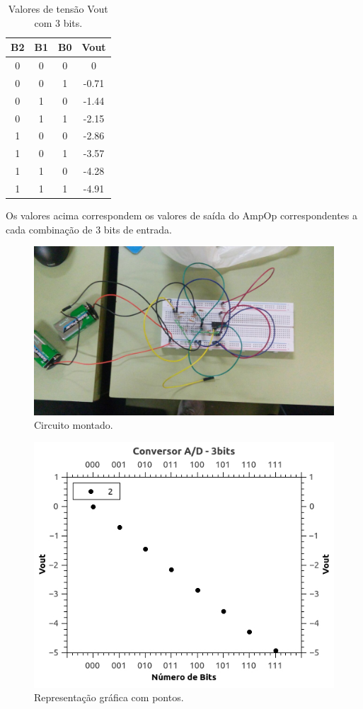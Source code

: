 \documentclass[12pt]{article}
\begin{document}
\begin{table}[H]
    \centering
    \caption{Valores de tensão Vout com 3 bits.}
    \begin{tabular}{|c|c|c|c|}
    \cline{1-4}
    \multicolumn{1}{|c|}{B2} & \multicolumn{1}{|c|}{B1} & \multicolumn{1}{c|}{B0} & \multicolumn{1}{|c|}{Vout} \\
    \hline
    0 & 0 & 0 & 0 \\
    0 & 0 & 1 & -0.71 \\
    0 & 1 & 0 & -1.44 \\
    0 & 1 & 1 & -2.15  \\
    1 & 0 & 0 & -2.86  \\
    1 & 0 & 1 & -3.57  \\
    1 & 1 & 0 & -4.28  \\
    1 & 1 & 1 & -4.91  \\
    \hline
    \end{tabular}
    \label{tab:resultado3bit}
\end{table}

Os valores acima correspondem os valores de saída do AmpOp correspondentes a cada combinação de 3 bits de entrada.

\begin{figure}[H]
\centering
\includegraphics[width=.5\textwidth]{circuito.jpeg}
\caption{Circuito montado.}
\label{fig:circuito1}
\end{figure}


\begin{figure}[H]
\centering
\includegraphics[width=.5\textwidth]{grafico3bitdot.jpeg}
\caption{Representação gráfica com pontos.}
\label{fig:3bitdot}
\end{figure}
\end{document}
